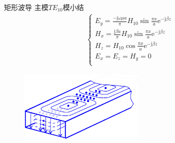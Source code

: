 \begin{frame}{矩形波导}
    主模$TE_{10}$模小结
    \begin{align*}
        \begin{cases}
            E_y=\frac{-\mathrm{j}\omega\mu a}{\pi}H_{10}\sin\frac{\pi x}{a}\mathrm{e}^{-\mathrm{j}\beta z} \\
            H_x=\frac{\mathrm{j}\beta a}{\pi}H_{10}\sin\frac{\pi x}{a}\mathrm{e}^{-\mathrm{j}\beta z}      \\
            H_z=H_{10}\cos\frac{\pi x}{a}\mathrm{e}^{-\mathrm{j}\beta z}                                   \\
            E_x=E_z=H_y=0                                                                                  \\
        \end{cases}
    \end{align*}

    \begin{figure}
        \flushright
        \includegraphics[width=6cm]{Cha6//fig6-12.png}
    \end{figure}
\end{frame}

